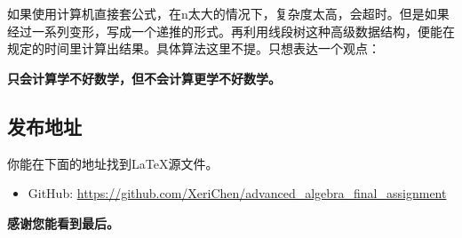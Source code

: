 \documentclass[12pt,hyperref,a4paper,UTF8]{ctexart}
\begin{document}
如果使用计算机直接套公式，在n太大的情况下，复杂度太高，会超时。但是如果经过一系列变形，写成一个递推的形式。再利用线段树这种高级数据结构，便能在规定的时间里计算出结果。具体算法这里不提。只想表达一个观点：

\textbf{只会计算学不好数学，但不会计算更学不好数学。}

\subsection{发布地址}
你能在下面的地址找到\LaTeX 源文件。
\begin{itemize}
    \item GitHub: \url{https://github.com/XeriChen/advanced_algebra_final_assignment}
\end{itemize}

\vspace{1cm}
\Huge{\textbf{感谢您能看到最后。}}

\end{document}
